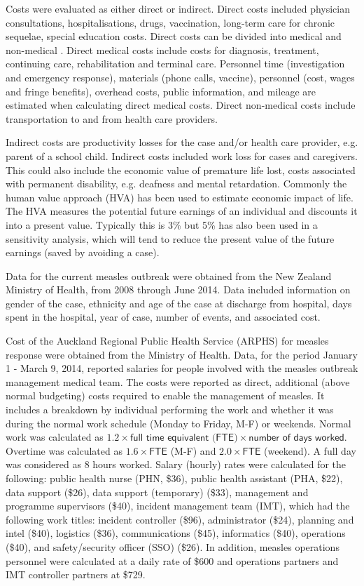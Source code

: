 \documentclass{article}
\begin{document}
\begin{itemize}
Costs were evaluated as either direct or indirect. Direct costs included physician consultations, hospitalisations, drugs, vaccination, long-term care for chronic sequelae, special education costs. Direct costs can be divided into medical and non-medical \citep{saha13}. Direct medical costs include costs for diagnosis, treatment, continuing care, rehabilitation and terminal care. Personnel time (investigation and emergency response), materials (phone calls, vaccine), personnel (cost, wages and fringe benefits), overhead costs, public information, and mileage are estimated when calculating direct medical costs. Direct non-medical costs include transportation to and from health care providers.

Indirect costs are productivity losses for the case and/or health care provider, e.g. parent of a school child. Indirect costs included work loss for cases and caregivers. This could also include the economic value of premature life lost, costs associated with permanent disability, e.g. deafness and mental retardation. Commonly the human value approach (HVA) has been used to estimate economic impact of life. The HVA measures the potential future earnings of an individual and discounts it into a present value. Typically this is 3\% but 5\% has also been used in a sensitivity analysis, which will tend to reduce the present value of the future earnings (saved by avoiding a case).

Data for the current measles outbreak were obtained from the New Zealand Ministry of Health, from 2008 through June 2014. Data included information on gender of the case, ethnicity and age of the case at discharge from hospital, days spent in the hospital, year of case, number of events, and associated cost.

Cost of the Auckland Regional Public Health Service (ARPHS) for measles response were obtained from the Ministry of Health. Data, for the period January 1 - March 9, 2014, reported salaries for people involved with the measles outbreak management medical team. The costs were reported as direct, additional (above normal budgeting) costs required to enable the management of measles. It includes a breakdown by individual performing the work and whether it was during the normal work schedule (Monday to Friday, M-F) or weekends. Normal work was calculated as $1.2 \times \textsf{full time equivalent (FTE)} \times \textsf{number of days worked}$. Overtime was calculated as $1.6\times\textsf{FTE}$ (M-F) and $2.0 \times \textsf{FTE}$ (weekend). A full day was considered as 8 hours worked. Salary (hourly) rates were calculated for the following: public health nurse (PHN, \$36), public health assistant (PHA, \$22), data support (\$26), data support (temporary) (\$33), management and programme supervisors (\$40), incident management team (IMT), which had the following work titles: incident controller (\$96), administrator (\$24), planning and intel (\$40), logistics (\$36), communications (\$45), informatics (\$40), operations (\$40), and safety/security officer (SSO) (\$26). In addition, measles operations personnel were calculated at a daily rate of \$600 and operations partners and IMT controller partners at \$729.


\end{itemize}
\end{document}
